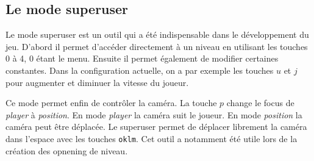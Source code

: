 \documentclass{article}
\begin{document}
\subsection{Le mode superuser}
Le mode superuser est un outil qui a été indispensable dans le développement du jeu. D'abord il permet 
d'accéder directement à un niveau en utilisant les touches 0 à 4, 0 étant le menu. Ensuite il permet 
également de modifier certaines constantes. Dans la configuration actuelle, on a par exemple les 
touches $u$ et $j$ pour augmenter et diminuer la vitesse du joueur.

Ce mode permet enfin de contrôler la caméra. La touche $p$ change le focus de \textit{player} à 
\textit{position}. En mode \textit{player} la caméra suit le joueur. En mode \textit{position} 
la caméra peut être déplacée. Le superuser permet de déplacer librement la caméra dans l'espace
 avec les touches \verb|oklm|. Cet outil a notamment été utile lors de la création des opnening 
 de niveau.
\end{document}
